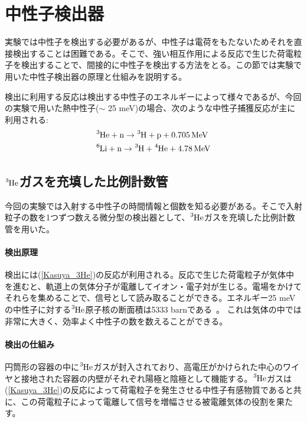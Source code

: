 \section{中性子検出器}
実験では中性子を検出する必要があるが、中性子は電荷をもたないためそれを直接検出することは困難である。そこで、強い相互作用による反応で生じた荷電粒子を検出することで、間接的に中性子を検出する方法をとる。この節では実験で用いた中性子検出器の原理と仕組みを説明する。

検出に利用する反応は検出する中性子のエネルギーによって様々であるが、今回の実験で用いた熱中性子($\sim$ 25 meV)の場合、次のような中性子捕獲反応が主に利用される:
\begin{align}
&\ce{^3He} + \ce{n} \to \ce{^3H}+\ce{p} + 0.705 \, \mathrm{MeV} \label{Kasuya_3He} \\
&\ce{^6Li} + \ce{n} \to \ce{^3H}+\ce{^4He}+4.78 \, \mathrm{MeV} \label{Kasuya_6Li}
\end{align}

\subsection{$\ce{^3He}$ガスを充填した比例計数管}
今回の実験では入射する中性子の時間情報と個数を知る必要がある。そこで入射粒子の数を1つずつ数える微分型の検出器として、$\ce{^3He}$ガスを充填した比例計数管を用いた。

\paragraph{検出原理}
検出には(\ref{Kasuya_3He})の反応が利用される。反応で生じた荷電粒子が気体中を進むと、軌道上の気体分子が電離してイオン・電子対が生じる。電場をかけてそれらを集めることで、信号として読み取ることができる。エネルギー25 meVの中性子に対する$\ce{^3He}$原子核の断面積は5333 barnである~\cite{JENDL}。
これは気体の中では非常に大きく、効率よく中性子の数を数えることができる。

\paragraph{検出の仕組み}
円筒形の容器の中に$\ce{^3He}$ガスが封入されており、高電圧がかけられた中心のワイヤと接地された容器の内壁がそれぞれ陽極と陰極として機能する。$\ce{^3He}$ガスは(\ref{Kasuya_3He})の反応によって荷電粒子を発生させる中性子有感物質であると共に、この荷電粒子によって電離して信号を増幅させる被電離気体の役割を果たす。

